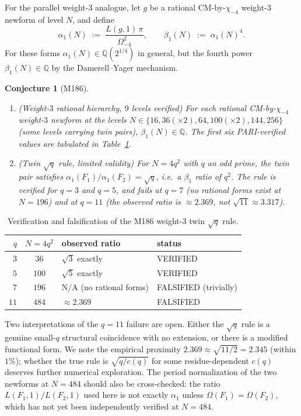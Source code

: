 \documentclass[12pt]{amsart}
\newtheorem{conjecture}[theorem]{Conjecture}
\theoremstyle{definition}
\newcommand{\Q}{\mathbb{Q}}
\begin{document}
For the parallel weight-$3$ analogue, let $g$ be a rational
CM-by-$\chi_{-4}$ weight-$3$ newform of level $N$, and define
\[
  \alpha_1(N) \;:=\; \frac{L(g,1)\,\pi}{\Omega_{-4}^2}, \qquad
  \beta_1(N) \;:=\; \alpha_1(N)^4.
\]
For these forms $\alpha_1(N) \in \Q(2^{1/4})$ in general, but the
fourth power $\beta_1(N) \in \Q$ by the Damerell--Yager mechanism.

\begin{conjecture}[M186]\label{conj:M186}
\leavevmode
\begin{enumerate}[leftmargin=2em]
  \item (Weight-$3$ rational hierarchy, $9$ levels verified) For each
    rational CM-by-$\chi_{-4}$ weight-$3$ newform at the levels
    $N \in \{16, 36(\times 2), 64, 100(\times 2), 144, 256\}$ (some
    levels carrying twin pairs), $\beta_1(N) \in \Q$. The first six
    PARI-verified values are tabulated in Table~\ref{tab:M186}.
  \item (Twin $\sqrt{q}$ rule, \emph{limited} validity) For $N = 4q^2$
    with $q$ an odd prime, the twin pair satisfies
    $\alpha_1(F_1)/\alpha_1(F_2) = \sqrt{q}$, i.e.\ a $\beta_1$ ratio
    of $q^2$. The rule is verified for $q = 3$ and $q = 5$, and
    \emph{fails} at $q = 7$ (no rational forms exist at $N = 196$) and
    at $q = 11$ (the observed ratio is $\approx 2.369$, not
    $\sqrt{11} \approx 3.317$).
\end{enumerate}
\end{conjecture}

\begin{table}[h]
  \caption{Verification and falsification of the M186 weight-$3$
  twin $\sqrt{q}$ rule.}
  \label{tab:M186}
  \renewcommand{\arraystretch}{1.20}
  \begin{tabular}{rcll}
    \toprule
    $q$ & $N = 4q^2$ & observed ratio & status \\
    \midrule
    $3$  & $36$  & $\sqrt{3}$ exactly       & VERIFIED \\
    $5$  & $100$ & $\sqrt{5}$ exactly       & VERIFIED \\
    $7$  & $196$ & N/A (no rational forms)  & FALSIFIED (trivially) \\
    $11$ & $484$ & $\approx 2.369$          & FALSIFIED \\
    \bottomrule
  \end{tabular}
\end{table}

Two interpretations of the $q = 11$ failure are open. Either the
$\sqrt q$ rule is a genuine small-$q$ structural coincidence with no
extension, or there is a modified functional form. We note the empirical
proximity $2.369 \approx \sqrt{11/2} = 2.345$ (within $1\%$); whether
the true rule is $\sqrt{q/c(q)}$ for some residue-dependent $c(q)$
deserves further numerical exploration. The period normalization of
the two newforms at $N = 484$ should also be cross-checked: the
ratio $L(F_1,1)/L(F_2,1)$ used here is not exactly $\alpha_1$ unless
$\Omega(F_1) = \Omega(F_2)$, which has not yet been independently
verified at $N = 484$.
\end{document}
